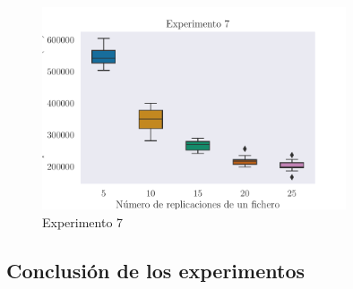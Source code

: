 \begin{figure}[H]
\centering
\includegraphics[width=0.8\textwidth]{include/plots/ex7_ttt_bplot.pdf}
\caption{Experimento 7}%
\label{fig:ex7ttt}
\end{figure}

\subsection{Conclusión de los experimentos}
    
    
    
